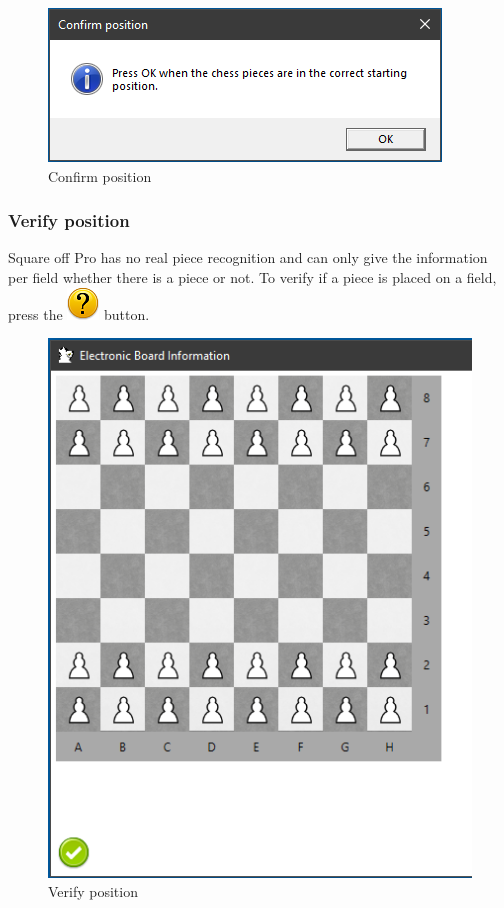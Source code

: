 \documentclass[11pt,a4paper]{article}
\begin{document}
\begin{figure}[H]
	\centering
	\includegraphics[scale=0.8]{Pegasus4.png}
	\caption{Confirm position}
	\label{fig:SquareOffPro4}
\end{figure}

\subsubsection{Verify position} \label{VerifyPegasusPosition}
Square off Pro has no real piece recognition and can only give the information per field whether there is a piece or not. To verify if a piece is placed on a field, press the  \includegraphics[scale=0.4]{emotion_question.png} button.

\begin{figure}[H]
	\centering
	\includegraphics[scale=0.8]{Pegasus5.png}
	\caption{Verify position}
	\label{fig:SquareOffPro5}
\end{figure}
\end{document}
